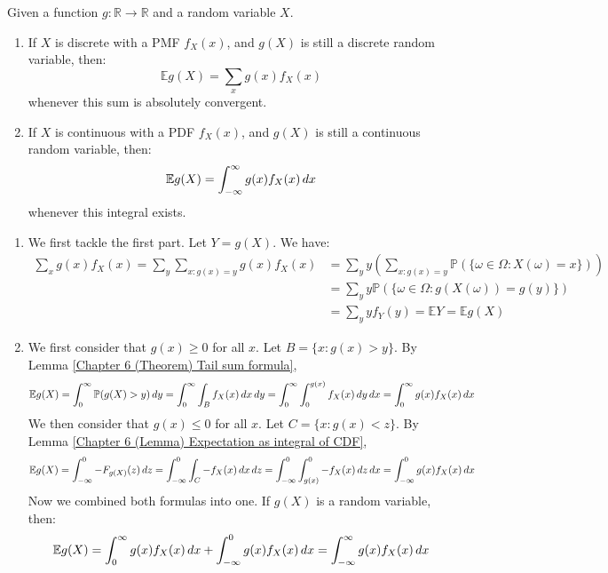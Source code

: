 \documentclass{huhtakm-template-book}
\newcommand{\prob}{\mathbb{P}}
\newcommand{\expect}{\mathbb{E}}
\begin{document}
\begin{thm}
	\label{Chapter 6 (Theorem) Expectation of function of random variable}
	Given a function $g:\mathbb{R}\to\mathbb{R}$ and a random variable $X$.
	\begin{enumerate}
		\item If  $X$ is discrete with a PMF $f_{X}(x)$, and $g(X)$ is still a discrete random variable, then:
		\begin{equation*}
			\expect{g(X)}=\sum_{x}g(x)f_{X}(x)
		\end{equation*}
		whenever this sum is absolutely convergent.
		\item If $X$ is continuous with a PDF $f_{X}(x)$, and $g(X)$ is still a continuous random variable, then:
		\begin{equation*}
			\expect{g(X)}=\intinfty g(x)f_{X}(x)\,dx
		\end{equation*}
		whenever this integral exists.
	\end{enumerate}
\end{thm}
\begin{proofing}
	\begin{enumerate}
		\item We first tackle the first part. Let $Y=g(X)$. We have:
		\begin{align*}
			\sum_{x}g(x)f_{X}(x)=\sum_{y}\sum_{x:g(x)=y}g(x)f_{X}(x)&=\sum_{y}y\left(\sum_{x:g(x)=y}\prob(\{\omega\in\Omega:X(\omega)=x\})\right)\\
			&=\sum_{y}y\prob(\{\omega\in\Omega:g(X(\omega))=g(y)\})\\
			&=\sum_{y}yf_{Y}(y)=\expect Y=\expect g(X)
		\end{align*}
		\item We first consider that $g(x)\geq 0$ for all $x$. Let $B=\{x:g(x)>y\}$. By Lemma \ref{Chapter 6 (Theorem) Tail sum formula},
		\begin{equation*}
			\expect{g(X)}=\intlu{0}{\infty}\prob(g(X)>y)\,dy=\intlu{0}{\infty}\int_{B}f_{X}(x)\,dx\,dy=\intlu{0}{\infty}\intlu{0}{g(x)}f_{X}(x)\,dy\,dx=\intlu{0}{\infty}g(x)f_{X}(x)\,dx
		\end{equation*}
		We then consider that $g(x)\leq 0$ for all $x$. Let $C=\{x:g(x)<z\}$. By Lemma \ref{Chapter 6 (Lemma) Expectation as integral of CDF},
		\begin{equation*}
			\expect{g(X)}=\intlu{-\infty}{0}-F_{g(X)}(z)\,dz=\intlu{-\infty}{0}\int_{C}-f_{X}(x)\,dx\,dz=\intlu{-\infty}{0}\intlu{g(x)}{0}-f_{X}(x)\,dz\,dx=\intlu{-\infty}{0}g(x)f_{X}(x)\,dx
		\end{equation*}
		Now we combined both formulas into one. If $g(X)$ is a random variable, then:
		\begin{equation*}
			\expect{g(X)}=\int_{0}^{\infty}g(x)f_{X}(x)\,dx+\intlu{-\infty}{0}g(x)f_{X}(x)\,dx=\intinfty g(x)f_{X}(x)\,dx
		\end{equation*}
	\end{enumerate}
\end{proofing}
\end{document}
